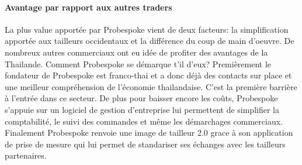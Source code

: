 \paragraph{Avantage par rapport aux autres traders}
La plus value apportée par Probespoke vient de deux facteurs: la simplification apportée aux tailleurs occidentaux et la différence du coup de main d'oeuvre.
De nombreux autres commerciaux ont eu idée de profiter des avantages de la Thailande. Comment Probespoke se démarque t'il d'eux? Premièrement le fondateur de Probespoke est franco-thai et a donc déjà des contacts sur place et une meilleur compréhension de l'économie thailandaise. C'est la première barrière à l'entrée dans ce secteur. De plus pour baisser encore les coûts, Probespoke s'appuie sur un logiciel de gestion d'entreprise lui permettent de simplifier la comptabilité, le suivi des commandes et même les démarchages commerciaux. Finalement Probespoke renvoie une image de tailleur 2.0 grace à son application de prise de mesure qui lui permet de standariser ses échanges avec les tailleurs partenaires.
